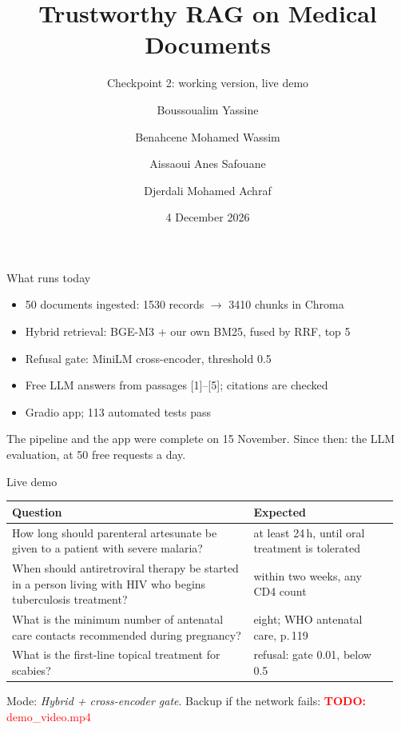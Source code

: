 \documentclass[12pt,aspectratio=169]{beamer}
\title{Trustworthy RAG on Medical Documents}
\subtitle{Checkpoint 2: working version, live demo}
\author{Boussoualim Yassine \and Benahcene Mohamed Wassim \and Aissaoui Anes Safouane \and Djerdali Mohamed Achraf}
\institute{LLM Final Projects 2026--2027, Prof.\ A.\ Moussaoui, Project 2\\
  Group \TODO{group number} \quad \TODO{school}}
\date{4 December 2026}
\newcommand{\TODO}[1]{\textcolor{red}{\textbf{TODO:} #1}}
\begin{document}
\begin{frame}
  \titlepage
\end{frame}

\begin{frame}{What runs today}
  \begin{itemize}
    \item 50 documents ingested: 1530 records $\to$ 3410 chunks in Chroma
    \item Hybrid retrieval: BGE-M3 + our own BM25, fused by RRF, top 5
    \item Refusal gate: MiniLM cross-encoder, threshold 0.5
    \item Free LLM answers from passages [1]--[5]; citations are checked
    \item Gradio app; 113 automated tests pass
  \end{itemize}
  \vfill
  \small The pipeline and the app were complete on 15 November. Since then: the LLM evaluation, at 50 free requests a day.
\end{frame}

\begin{frame}{Live demo}
  \footnotesize
  \begin{tabular}{@{}p{0.6\linewidth}p{0.36\linewidth}@{}}
    \toprule
    Question & Expected \\
    \midrule
    How long should parenteral artesunate be given to a patient with severe malaria? & at least 24\,h, until oral treatment is tolerated \\
    When should antiretroviral therapy be started in a person living with HIV who begins tuberculosis treatment? & within two weeks, any CD4 count \\
    What is the minimum number of antenatal care contacts recommended during pregnancy? & eight; WHO antenatal care, p.\,119 \\
    \midrule
    What is the first-line topical treatment for scabies? & refusal: gate 0.01, below 0.5 \\
    \bottomrule
  \end{tabular}
  \smallskip

  Mode: \emph{Hybrid + cross-encoder gate}. Backup if the network fails: \TODO{demo\_video.mp4}
\end{frame}
\end{document}

